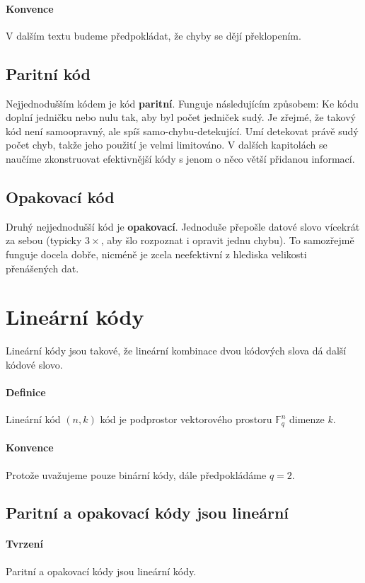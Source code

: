 \documentclass[a4paper,12pt]{article}
\newcommand{\F}{\mathbb{F}}
\begin{document}
\paragraph{Konvence}
V dalším textu budeme předpokládat, že chyby se dějí překlopením.

\subsection{Paritní kód}
Nejjednodušším kódem je kód \textbf{paritní}. Funguje následujícím způsobem: Ke 
kódu doplní jedničku nebo nulu tak, aby byl počet jedniček sudý. Je zřejmé, že 
takový kód není samoopravný, ale spíš samo-chybu-detekující. Umí detekovat právě 
sudý počet chyb, takže jeho použití je velmi limitováno. V dalších kapitolách se 
naučíme zkonstruovat efektivnější kódy s jenom o něco větší přidanou informací.

\subsection{Opakovací kód}
Druhý nejjednodušší kód je \textbf{opakovací}. Jednoduše přepošle datové slovo 
vícekrát za sebou (typicky $3\times$, aby šlo rozpoznat i opravit jednu chybu).  
To samozřejmě funguje docela dobře, nicméně je zcela neefektivní z hlediska 
velikosti přenášených dat.

\section{Lineární kódy}
Lineární kódy jsou takové, že lineární kombinace dvou kódových slova dá další 
kódové slovo.
\paragraph{Definice}
Lineární kód $(n,k)$ kód je podprostor vektorového prostoru $\F_q^n$ dimenze 
$k$.
\paragraph{Konvence}
Protože uvažujeme pouze binární kódy, dále předpokládáme $q=2$.

\subsection{Paritní a opakovací kódy jsou lineární}
\paragraph{Tvrzení}
Paritní a opakovací kódy jsou lineární kódy.
\end{document}

